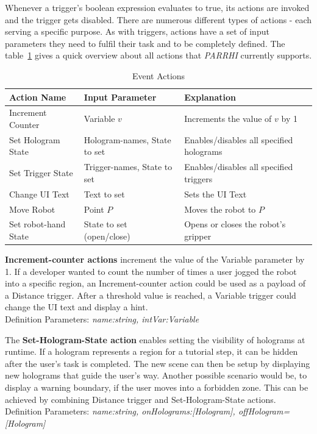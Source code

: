 Whenever a trigger's boolean expression evaluates to true, its actions are invoked and the trigger gets disabled. There are numerous different types of actions - each serving a specific purpose. As with triggers, actions have a set of input parameters they need to fulfil their task and to be completely defined. The table~\ref{Table:Actions} gives a quick overview about all actions that \textit{PARRHI} currently supports.

\begin{table}
	\caption{Event Actions}
	\label{Table:Actions}
	\centering
	\begin{tabular}{lll}
		\toprule
		Action Name & Input Parameter		& Explanation	\\		
		\midrule
		Increment Counter  	& Variable $v$					& Increments the value of $v$ by 1 \\
		Set Hologram State 	& Hologram-names, State to set	& Enables/disables all specified holograms \\
		Set Trigger State  	& Trigger-names, State to set  	& Enables/disables all specified triggers \\
		Change UI Text	  	& Text to set					& Sets the UI Text\\
		Move Robot			& Point $P$						& Moves the robot to $P$ \\
		Set robot-hand State & State to set (open/close)		& Opens or closes the robot's gripper \\
		\bottomrule
	\end{tabular}
\end{table}

\textbf{Increment-counter actions} increment the value of the Variable parameter by 1. If a developer wanted to count the number of times a user jogged the robot into a specific region, an Increment-counter action could be used as a payload of a Distance trigger. After a threshold value is reached, a Variable trigger could change the UI text and display a hint.\\Definition Parameters: \textit{name:string, intVar:Variable}

The \textbf{Set-Hologram-State action} enables setting the visibility of holograms at runtime. If a hologram represents a region for a tutorial step, it can be hidden after the user's task is completed. The new scene can then be setup by displaying new holograms that guide the user's way. Another possible scenario would be, to display a warning boundary, if the user moves into a forbidden zone. This can be achieved by combining Distance trigger and Set-Hologram-State actions.\\Definition Parameters: \textit{name:string, onHolograms:[Hologram], offHologram=[Hologram]}

